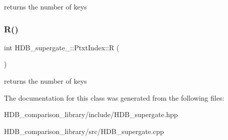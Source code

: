 returns the number of keys \mbox{\label{classHDB__supergate___1_1PtxtIndex_a25639e96fd7fbb05fd2406fa8a9e43de}} 
\subsubsection{\texorpdfstring{R()}{R()}\hspace{0.1cm}{\footnotesize\ttfamily [2/2]}}
{\footnotesize\ttfamily int H\+D\+B\+\_\+supergate\+\_\+\+::\+Ptxt\+Index\+::R (\begin{DoxyParamCaption}{ }\end{DoxyParamCaption})\hspace{0.3cm}{\ttfamily [inline]}}

returns the number of keys 

The documentation for this class was generated from the following files\+:\begin{DoxyCompactItemize}
\item 
H\+D\+B\+\_\+comparison\+\_\+library/include/H\+D\+B\+\_\+supergate.\+hpp\item 
H\+D\+B\+\_\+comparison\+\_\+library/src/H\+D\+B\+\_\+supergate.\+cpp\end{DoxyCompactItemize}
